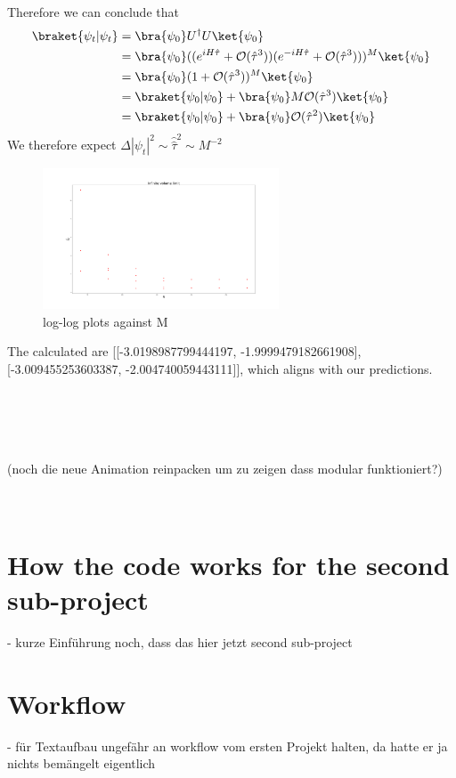 \documentclass[11pt, letterpaper, onecolumn]{article}
\begin{document}
Therefore we can conclude that
\begin{align*}
    \braket{\psi_t|\psi_t}&=\bra{\psi_0}U^\dagger U\ket{\psi_0}\\
    &=\bra{\psi_0}((e^{iH\hat{\tau}}+\mathcal{O}(\hat{\tau}^3))(e^{-iH\hat{\tau}}+\mathcal{O}(\hat{\tau}^3)))^M\ket{\psi_0}\\
    &=\bra{\psi_0}(1+\mathcal{O}(\hat{\tau}^3))^M\ket{\psi_0}\\
    &=\braket{\psi_0|\psi_0}+\bra{\psi_0}M\mathcal{O}(\hat{\tau}^3)\ket{\psi_0}\\
    &=\braket{\psi_0|\psi_0}+\bra{\psi_0}\mathcal{O}(\hat{\tau}^2)\ket{\psi_0}
\end{align*}
We therefore expect $\Delta|\psi_t|^2\sim\hat{\hat{\tau}}^2\sim M^{-2}$
	\begin{figure} [h] 
	\begin{center}
	\includegraphics[width=7cm]{"inf_vol_lim.png"}
	\caption{log-log plots against M}
	\end{center}
	\end{figure}
	The calculated are [[-3.0198987799444197, -1.9999479182661908], [-3.009455253603387, -2.004740059443111]], which aligns with our predictions.
	

	\\
 	\\
  	\\
   	\\
 	(noch die neue Animation reinpacken um zu zeigen dass modular funktioniert?)
  	\\
   	\\
    	\\
	
	\section{How the code works for the second sub-project}	
	- kurze Einführung noch, dass das hier jetzt second sub-project
	
	
	
	\section{Workflow}
	- für Textaufbau ungefähr an workflow vom ersten Projekt halten, da hatte er ja nichts bemängelt eigentlich
	
\end{document}
